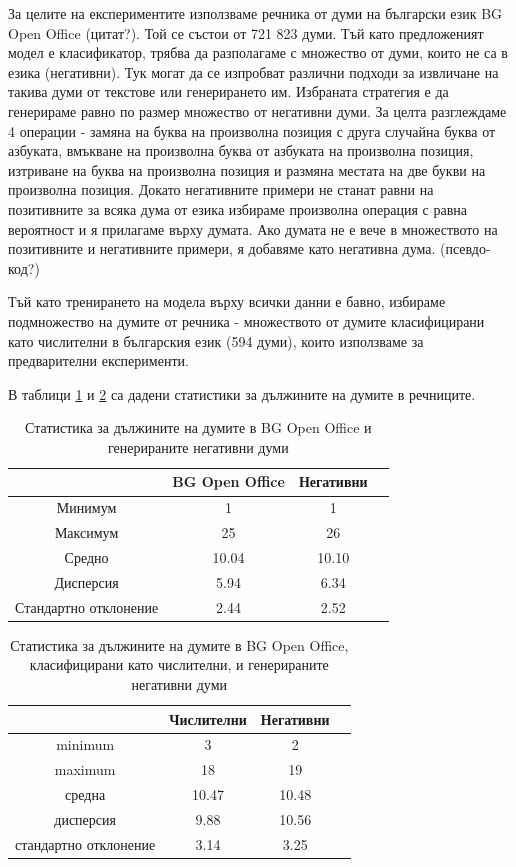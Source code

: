\documentclass[a4paper,12pt]{article}
\begin{document}
За целите на експериментите използваме речника от думи на български език BG Open Office (цитат?). Той се състои от 721 823 думи. Тъй като предложеният модел е класификатор, трябва да разполагаме с множество от думи, които не са в езика (негативни). Тук могат да се изпробват различни подходи за извличане на такива думи от текстове или генерирането им. Избраната стратегия е да генерираме равно по размер множество от негативни думи. За целта разглеждаме 4 операции - замяна на буква на произволна позиция с друга случайна буква от азбуката, вмъкване на произволна буква от азбуката на произволна позиция, изтриване на буква на произволна позиция и размяна местата на две букви на произволна позиция. Докато негативните примери не станат равни на позитивните за всяка дума от езика избираме произволна операция с равна вероятност и я прилагаме върху думата. Ако думата не е вече в множеството на позитивните и негативните примери, я добавяме като негативна дума. (псевдо-код?)

Тъй като тренирането на модела върху всички данни е бавно, избираме подмножество на думите от речника - множеството от думите класифицирани като числителни в българския език (594 думи), които използваме за предварителни експерименти. 

В таблици \ref{table:1} и \ref{table:2} са дадени статистики за дължините на думите в речниците.

\begin{table}[h!]
\centering
\begin{tabular}{|c|c|c|c|}
\hline
& BG Open Office & Негативни \\
\hline
Минимум & 1 & 1\\
\hline
Максимум & 25 & 26\\
\hline
Средно & 10.04 & 10.10\\
\hline
Дисперсия & 5.94 & 6.34\\
\hline
Стандартно отклонение & 2.44 & 2.52\\
\hline
\end{tabular}
\caption{Статистика за дължините на думите в BG Open Office и генерираните негативни думи}
\label{table:1}
\end{table}

\begin{table}[h!]
\centering
\begin{tabular}{|c|c|c|c|}
\hline
& Числителни & Негативни \\
\hline
minimum & 3 & 2\\
\hline
maximum & 18 & 19\\
\hline
средна & 10.47 & 10.48\\
\hline
дисперсия & 9.88 & 10.56\\
\hline
стандартно отклонение & 3.14 & 3.25\\
\hline
\end{tabular}
\caption{Статистика за дължините на думите в BG Open Office, класифицирани като числителни, и генерираните негативни думи}
\label{table:2}
\end{table}
\end{document}
